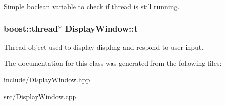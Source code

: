 \-Simple boolean variable to check if thread is still running. 

\hypertarget{classDisplayWindow_a1a4a4a8242cf94ccf43d1c75921f15e2}{
\subsubsection[{t}]{\setlength{\rightskip}{0pt plus 5cm}boost\-::thread$\ast$ {\bf \-Display\-Window\-::t}}}\label{classDisplayWindow_a1a4a4a8242cf94ccf43d1c75921f15e2}


\-Thread object used to display disp\-Img and respond to user input. 



\-The documentation for this class was generated from the following files\-:\begin{DoxyCompactItemize}
\item 
include/\hyperlink{DisplayWindow_8hpp}{\-Display\-Window.\-hpp}\item 
src/\hyperlink{DisplayWindow_8cpp}{\-Display\-Window.\-cpp}\end{DoxyCompactItemize}
